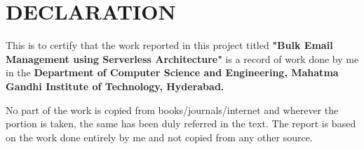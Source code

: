 \chapter*{DECLARATION}

\doublespace
\doublespace

\qquad 

\vspace{2cm}
\justifying

\noindent
This is to certify that the work reported in this project titled \textbf{"Bulk Email Management using Serverless Architecture"} is a record of work done by me in the \textbf{Department of Computer Science and Engineering, Mahatma Gandhi Institute of Technology, Hyderabad.} \par

\noindent
No part of the work is copied from books/journals/internet and wherever the portion is taken, the same has been duly referred in the text. The report is based on the work done entirely by me and not copied from any other source.



\vskip 2cm

\vskip -1cm
\par
